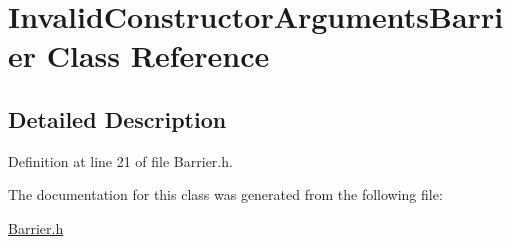 \hypertarget{class_invalid_constructor_arguments_barrier}{\section{Invalid\+Constructor\+Arguments\+Barrier Class Reference}
\label{class_invalid_constructor_arguments_barrier}
}


\subsection{Detailed Description}


Definition at line 21 of file Barrier.\+h.



The documentation for this class was generated from the following file\+:\begin{DoxyCompactItemize}
\item 
\hyperlink{_barrier_8h}{Barrier.\+h}\end{DoxyCompactItemize}
